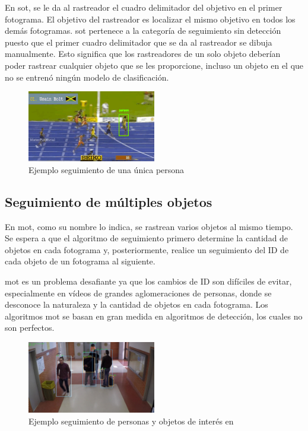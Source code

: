 En \gls{sot}, se le da al rastreador el cuadro delimitador del objetivo en el primer fotograma. El objetivo del rastreador es localizar el mismo objetivo en todos los demás fotogramas. \gls{sot} pertenece a la categoría de seguimiento sin detección puesto que el primer cuadro delimitador que se da al rastreador se dibuja manualmente. Esto significa que los rastreadores de un solo objeto deberían poder rastrear cualquier objeto que se les proporcione, incluso un objeto en el que no se entrenó ningún modelo de clasificación.

\begin{figure}[ht]
\centering
\includegraphics[width=0.5\textwidth]{img/chapters/estado-del-arte/sot-usain-bolt.png}
\caption{\label{fig:sot-usain-bolt}Ejemplo seguimiento de una única persona \cite{object-tracking-dlib}}
\end{figure}

\subsection{Seguimiento de múltiples objetos}
\label{subsec:seguimiento-multiples-objeto}

En \gls{mot}, como su nombre lo indica, se rastrean varios objetos al mismo tiempo. Se espera a que el algoritmo de seguimiento primero determine la cantidad de objetos en cada fotograma y, posteriormente, realice un seguimiento del ID de cada objeto de un fotograma al siguiente.

\gls{mot} es un problema desafiante ya que los cambios de ID son difíciles de evitar, especialmente en vídeos de grandes aglomeraciones de personas, donde se desconoce la naturaleza y la cantidad de objetos en cada fotograma. Los algoritmos \gls{mot} se basan en gran medida en algoritmos de detección, los cuales no son perfectos.

\begin{figure}[ht]
\centering
\includegraphics[width=0.5\textwidth]{img/chapters/estado-del-arte/mot-gba.jpg}
\caption{\label{fig:mot-gba}Ejemplo seguimiento de personas y objetos de interés en \cite{gba-dataset}}
\end{figure}

